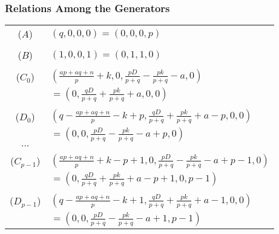 \documentclass{beamer}
\begin{document}
\begin{frame}
\begin{center}
\frametitle{Relations Among the Generators}

{\scriptsize
\begin{center}
\begin{tabular}{cl}
($A$) & $\left(q, 0, 0, 0\right)=\left(0, 0, 0, p\right)$\\
 &\\
($B$) & $\left(1, 0, 0, 1\right) = \left(0, 1, 1, 0\right)$\\
 &\\
($C_0$) & $\left(\frac{a p + a q + n}{p} + k, 0, \frac{p D}{p + q} - \frac{p k}{p + q} - a, 0\right)$\\
 & $ = \left(0, \frac{q D}{p + q} + \frac{p k}{p + q} + a, 0, 0\right)$\\
 &\\
($D_0$) & $\left(q - \frac{a p + a q + n}{p} - k + p, \frac{q D}{p + q} + \frac{p k}{p + q} + a - p, 0, 0\right)$\\
 & $ = \left(0, 0, \frac{p D}{p + q} - \frac{p k}{p + q} - a + p, 0\right)$\\
$\dots$ &\\
 &\\
($C_{p - 1}$) & $\left(\frac{a p + a q + n}{p} + k - p + 1, 0, \frac{p D}{p + q} - \frac{p k}{p + q} - a + p - 1, 0\right)$\\
 & $ = \left(0, \frac{q D}{p + q} + \frac{p k}{p + q} + a - p + 1, 0, p - 1\right)$\\
 &\\
($D_{p - 1}$) & $\left(q - \frac{a p + a q + n}{p} - k + 1, \frac{q D}{p + q} + \frac{p k}{p + q} + a - 1, 0, 0\right)$\\
 & $ = \left(0, 0, \frac{p D}{p + q} - \frac{p k}{p + q} - a + 1, p - 1\right)$\\
\end{tabular}
\end{center}
}

\end{center}
\end{frame}

\end{document}
